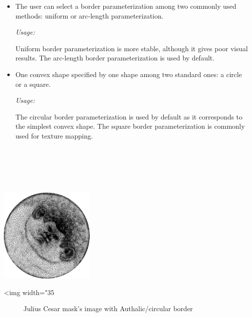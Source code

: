\begin{itemize}

\item
    The user can select a border parameterization among
    two commonly used methods: uniform or arc-length parameterization.

    \emph{Usage:}

    Uniform border parameterization is more stable, although it gives
    poor visual results. The
    arc-length border parameterization is used by default.

\item
    One convex shape specified by one shape among two standard ones:
    a circle or a square.

    \emph{Usage:}

    The circular border parameterization is used by default as it
    corresponds to the simplest convex shape. The square border
    parameterization is commonly used for texture mapping.

\end{itemize}

  \\
  \\
  \\
  \\

\begin{center}
    \label{Surface_mesh_parameterization-fig-circular_border}
    \begin{ccTexOnly}
        \includegraphics[width=0.35\textwidth]{Surface_mesh_parameterization/circular_border}
    \end{ccTexOnly}
    \begin{ccHtmlOnly}
        <img width="35%
    \end{ccHtmlOnly}
    \begin{figure}[h]
        \caption{Julius Cesar mask's image with Authalic/circular border}
    \end{figure}
\end{center}

